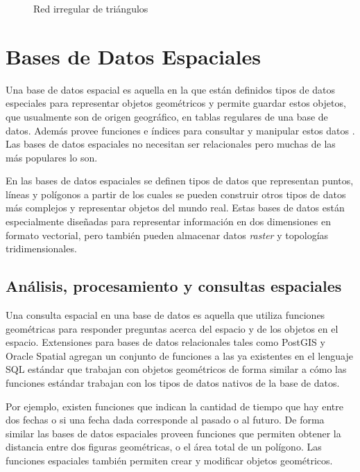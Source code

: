 \begin{figure}[h]
	\centering
	
	\caption{Red irregular de triángulos}
	\label{fig:modelo-tin} 
\end{figure}

\section{Bases de Datos Espaciales}

Una base de datos espacial es aquella en la que están definidos tipos de datos especiales para representar objetos geométricos y permite guardar estos objetos, que usualmente son de origen geográfico, en tablas regulares de una base de datos. Además provee funciones e índices para consultar y manipular estos datos \cite{obe2011postgis}. Las bases de datos espaciales no necesitan ser relacionales pero muchas de las más populares lo son.

En las bases de datos espaciales se definen tipos de datos que representan puntos, líneas y polígonos a partir de los cuales se pueden construir otros tipos de datos más complejos y representar objetos del mundo real. Estas bases de datos están especialmente diseñadas para representar información en dos dimensiones en formato vectorial, pero también pueden almacenar datos \emph{raster} y topologías tridimensionales.

\subsection{Análisis, procesamiento y consultas espaciales}


Una consulta espacial en una base de datos es aquella que utiliza funciones geométricas para responder preguntas acerca del espacio y de los objetos en el espacio. Extensiones para bases de datos relacionales tales como PostGIS y Oracle Spatial agregan un conjunto de funciones a las ya existentes en el lenguaje SQL estándar que trabajan con objetos geométricos de forma similar a cómo las funciones estándar trabajan con los tipos de datos nativos de la base de datos.

Por ejemplo, existen funciones que indican la cantidad de tiempo que hay entre dos fechas o si una fecha dada corresponde al pasado o al futuro. De forma similar las bases de datos espaciales proveen funciones que permiten obtener la distancia entre dos figuras geométricas, o el área total de un polígono. Las funciones espaciales también permiten crear y modificar objetos geométricos.

